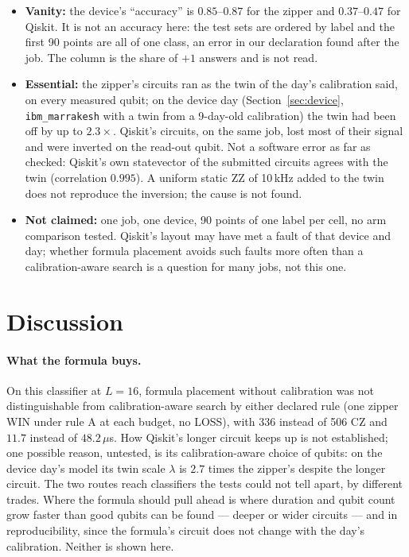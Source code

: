 \documentclass[11pt]{article}
\begin{document}
\begin{itemize}
\item \textbf{Vanity:} the device's ``accuracy'' is $0.85$--$0.87$ for the zipper and $0.37$--$0.47$ for Qiskit. It is
not an accuracy here: the test sets are ordered by label and the first 90 points are all of one class, an error in our
declaration found after the job. The column is the share of $+1$ answers and is not read.
\item \textbf{Essential:} the zipper's circuits ran as the twin of the day's calibration said, on every measured qubit;
on the device day (Section~\ref{sec:device}, \texttt{ibm\_marrakesh} with a twin from a 9-day-old calibration) the
twin had been off by up to $2.3\times$. Qiskit's circuits, on the same job, lost most of their signal and were inverted on the read-out
qubit. Not a software error as far as checked: Qiskit's own statevector of the submitted circuits agrees with the twin
(correlation $0.995$). A uniform static ZZ of 10\,kHz added to the twin does not reproduce the inversion; the cause is
not found.
\item \textbf{Not claimed:} one job, one device, 90 points of one label per cell, no arm comparison tested. Qiskit's
layout may have met a fault of that device and day; whether formula placement avoids such faults more often than a
calibration-aware search is a question for many jobs, not this one.
\end{itemize}

\section{Discussion}

\paragraph{What the formula buys.} On this classifier at $L = 16$, formula placement without calibration
was not distinguishable from calibration-aware search by either declared rule (one zipper WIN under rule A at each
budget, no LOSS), with 336 instead of 506 CZ and $11.7$ instead of $48.2\,\mu$s. How Qiskit's longer circuit keeps
up is not established; one possible reason, untested, is its calibration-aware choice of qubits: on the device day's
model its twin scale $\lambda$ is $2.7$ times the zipper's despite the longer circuit. The two routes reach
classifiers the tests could not tell apart, by different trades. Where the formula should pull ahead is where
duration and qubit count grow faster than good qubits can be found --- deeper or wider circuits --- and in
reproducibility, since the formula's circuit does not change with the day's calibration. Neither is shown here.
\end{document}
